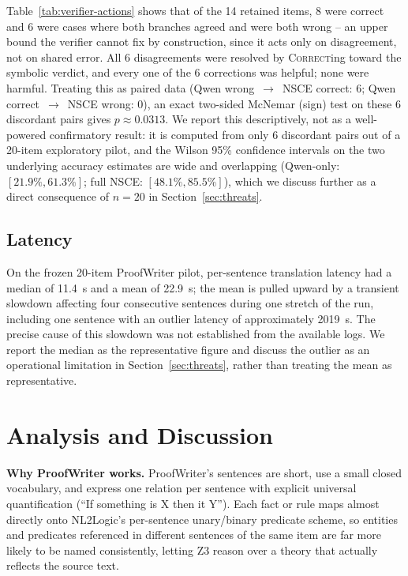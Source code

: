 \documentclass[conference]{IEEEtran}
\begin{document}
Table~\ref{tab:verifier-actions} shows that of the 14 retained items, 8 were correct and 6 were cases where both branches agreed and were both wrong -- an upper bound the verifier cannot fix by construction, since it acts only on disagreement, not on shared error. All 6 disagreements were resolved by \textsc{Correct}ing toward the symbolic verdict, and every one of the 6 corrections was helpful; none were harmful. Treating this as paired data (Qwen wrong~$\rightarrow$~NSCE correct: 6; Qwen correct~$\rightarrow$~NSCE wrong: 0), an exact two-sided McNemar (sign) test on these 6 discordant pairs gives $p \approx 0.0313$. We report this descriptively, not as a well-powered confirmatory result: it is computed from only 6 discordant pairs out of a 20-item exploratory pilot, and the Wilson 95\% confidence intervals on the two underlying accuracy estimates are wide and overlapping (Qwen-only: $[21.9\%, 61.3\%]$; full NSCE: $[48.1\%, 85.5\%]$), which we discuss further as a direct consequence of $n=20$ in Section~\ref{sec:threats}.

\subsection{Latency}
On the frozen 20-item ProofWriter pilot, per-sentence translation latency had a median of 11.4~s and a mean of 22.9~s; the mean is pulled upward by a transient slowdown affecting four consecutive sentences during one stretch of the run, including one sentence with an outlier latency of approximately 2019~s. The precise cause of this slowdown was not established from the available logs. We report the median as the representative figure and discuss the outlier as an operational limitation in Section~\ref{sec:threats}, rather than treating the mean as representative.

\section{Analysis and Discussion}
\label{sec:analysis}

\textbf{Why ProofWriter works.} ProofWriter's sentences are short, use a small closed vocabulary, and express one relation per sentence with explicit universal quantification (``If something is X then it Y''). Each fact or rule maps almost directly onto NL2Logic's per-sentence unary/binary predicate scheme, so entities and predicates referenced in different sentences of the same item are far more likely to be named consistently, letting Z3 reason over a theory that actually reflects the source text.
\end{document}
